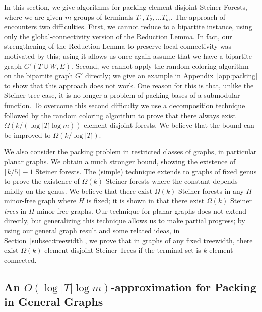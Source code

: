 \documentclass[11pt]{article}
\def\ceil#1{\lceil {#1} \rceil}
\begin{document}
In this section, we give algorithms for packing element-disjoint
Steiner Forests, where we are given $m$ groups of terminals $T_1, T_2,
\ldots T_m$. The approach of \cite{cs} encounters two difficulties.
First, we cannot reduce to a bipartite instance, using only the
global-connectivity version of the Reduction Lemma. In fact, our
strengthening of the Reduction Lemma to preserve local connectivity
was motivated by this; using it allows us once again assume that we
have a bipartite graph $G'(T \cup W, E)$.  Second, we cannot apply the
random coloring algorithm on the bipartite graph $G'$ directly; we
give an example in Appendix~\ref{app:packing} to show that this
approach does not work. One reason for this is that, unlike the
Steiner tree case, it is no longer a problem of packing bases of a
submodular function.  To overcome this second difficulty we use a
decomposition technique followed by the random coloring algorithm to
prove that there always exist $\Omega(k/(\log |T| \log m))$
element-disjoint forests.  We believe that the bound can be improved
to $\Omega(k/\log |T|)$.

We also consider the packing problem in restricted classes of graphs,
in particular planar graphs. We obtain a much stronger bound, showing
the existence of $\ceil{k/5} - 1$ Steiner forests. The (simple)
technique extends to graphs of fixed genus to prove the existence of
$\Omega(k)$ Steiner forests where the constant depends mildly on the
genus. We believe that there exist $\Omega(k)$ Steiner forests in any
$H$-minor-free graph where $H$ is fixed; it is shown in \cite{ACJ08}
that there exist $\Omega(k)$ Steiner \emph{trees} in $H$-minor-free
graphs. Our technique for planar graphs does not extend directly, but
generalizing this technique allows us to make partial progress; by
using our general graph result and some related ideas, in
Section~\ref{subsec:treewidth}, we prove that in graphs of any fixed
treewidth, there exist $\Omega(k)$ element-disjoint Steiner Trees if
the terminal set is $k$-element-connected.

\subsection{An $O(\log |T| \log m)$-approximation for Packing
in General Graphs}\label{subsec:generalPacking}
\end{document}
